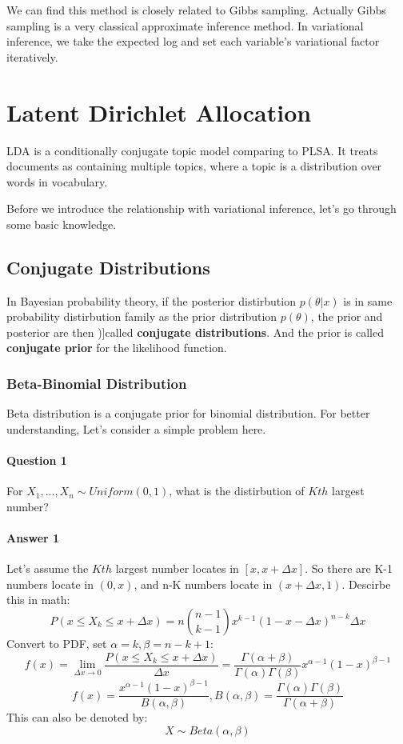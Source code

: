 \documentclass{article}
\begin{document}
We can find this method is closely related to Gibbs sampling. Actually Gibbs sampling is a very classical approximate inference method. In variational inference,
we take the expected log and set each variable’s variational factor iteratively.
\section{Latent Dirichlet Allocation}
LDA\cite{geigle2016inference} is a conditionally conjugate topic model comparing to PLSA. It treats documents as containing multiple topics, where a topic is a distribution over words in vocabulary. 

Before we introduce the relationship with variational inference, let's go through some basic knowledge.
\subsection{Conjugate Distributions}
In Bayesian probability theory, if the posterior distirbution $p(\theta | x)$ is in same probability distirbution family as the prior distribution $p(\theta)$, the prior and posterior are then )]called \textbf{conjugate distributions}. And the prior is called \textbf{conjugate prior} for the likelihood function.

\subsubsection{Beta-Binomial Distribution}
Beta distribution is a conjugate prior for binomial distribution. For better understanding, Let's consider a simple problem here. 
\paragraph{Question 1} For $X_{1},...,X_{n} \sim Uniform(0,1)$, what is the distirbution of $Kth$ largest number? 
\paragraph{Answer 1} Let's assume the $Kth$ largest number locates in $[x,x+\Delta x]$. So there are K-1 numbers locate in $(0,x)$, and n-K numbers locate in $(x+\Delta x,1)$. Descirbe this in math: 
$$P(x \leq X_{k} \leq x+\Delta x)=n \binom {n-1} {k-1} x^{k-1}(1-x-\Delta x)^{n-k}\Delta x$$
Convert to PDF, set $\alpha=k, \beta=n-k+1$:
$$f(x)= \lim_{\Delta x \rightarrow 0} \frac{P(x \leq X_{k} \leq x+\Delta x)}{\Delta x} =\frac{\Gamma(\alpha+\beta)}{\Gamma(\alpha)\Gamma(\beta)}x^{\alpha-1}(1-x)^{\beta-1} $$
$$f(x)=\frac{x^{\alpha-1}(1-x)^{\beta-1}}{B(\alpha,\beta)}, B(\alpha,\beta)=\frac{\Gamma(\alpha)\Gamma(\beta)}{\Gamma(\alpha+\beta)}$$
This can also be denoted by:
$$X \sim Beta(\alpha,\beta)$$
\end{document}
